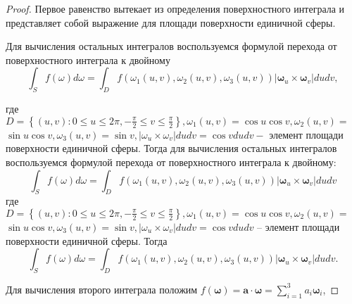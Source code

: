 \begin{proof}
Первое равенство вытекает из определения поверхностного интеграла
и представляет собой выражение для площади
поверхности единичной сферы.


Для вычисления остальных интегралов воспользуемся
формулой перехода от поверхностного интеграла
к двойному
\begin{equation}
    \label{eq:1_2:16}
    \int_{S} f(\omega) d \omega=\int_{D} f
    \left(\omega_{1}(u, v), \omega_{2}(u, v),
    \omega_{3}(u, v)\right)\left|\boldsymbol{\omega}_{u}
    \times \boldsymbol{\omega}_{v}\right| d u d v,
\end{equation}

где $D=\left\{(u, v): 0 \leqslant u \leqslant 2 \pi,-\frac{\pi}{2}
\leqslant v \leqslant \frac{\pi}{2}\right\},
\omega_{1}(u, v)=\cos u \cos v, \omega_{2}(u, v)=$ $\sin u \cos v, \omega_{3}(u, v)=\sin v,\left|\omega_{u}
\times \omega_{v}\right| d u d v=\cos v d u d v-$ элемент площади поверхности единичной сферы.
Тогда для вычисления остальных интегралов воспользуемся
формулой перехода от поверхностного интеграла
к двойному:
\[
    \int_{S} f(\omega) d \omega=\int_{D} f\left(\omega_{1}(u, v), \omega_{2}(u, v),
    \omega_{3}(u, v)\right)\left|\boldsymbol{\omega}_{u} \times \boldsymbol{\omega}_{v}\right| d u d v
\]
где $D=\left\{(u, v): 0 \leqslant u \leqslant 2 \pi,-\frac{\pi}{2} \leqslant v \leqslant
\frac{\pi}{2}\right\}, \omega_{1}(u, v)=\cos u \cos v, \omega_{2}(u, v)=$ $\sin u \cos v,
\omega_{3}(u, v)=\sin v,\left|\omega_{u} \times \omega_{v}\right| d u d v=\cos v d u d v$
-- элемент площади поверхности единичной сферы.
Тогда
\[
    \int_{S} f(\omega) d \omega=\int_{D} f\left(\omega_{1}(u, v), \omega_{2}(u, v),
    \omega_{3}(u, v)\right)\left|\boldsymbol{\omega}_{u}
    \times \boldsymbol{\omega}_{v}\right| d u d v.
\]



Для вычисления второго интеграла положим
$f(\boldsymbol{\omega})=\mathbf{a}
\cdot \boldsymbol{\omega}=\sum_{i=1}^{3} a_{i} \boldsymbol{\omega}_{i}$,


\end{proof}

